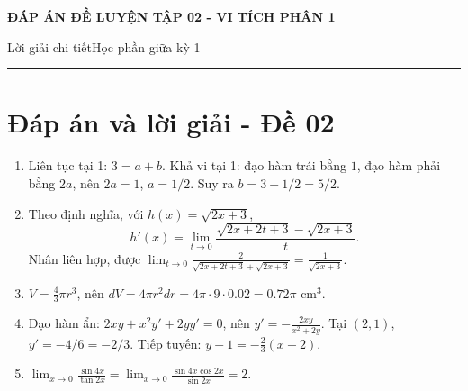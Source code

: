 \documentclass[11pt,a4paper]{article}
\newcommand{\examtitle}[4]{\begin{center}{\Large\bfseries\color{hcmusblue}#1}\par\vspace{3pt}{\large\bfseries #2}\par\vspace{3pt}\small #3\quad\textbullet\quad #4\end{center}\vspace{5pt}\hrule\vspace{8pt}}
\begin{document}
\examtitle{ĐÁP ÁN ĐỀ LUYỆN TẬP 02 - VI TÍCH PHÂN 1}{VI TÍCH PHÂN 1 - HCMUS (bộ luyện tập)}{Lời giải chi tiết}{Học phần giữa kỳ 1}

\section*{Đáp án và lời giải - Đề 02}
\begin{enumerate}
\item Liên tục tại 1: $3=a+b$. Khả vi tại 1: đạo hàm trái bằng $1$, đạo hàm phải bằng $2a$, nên $2a=1$, $a=1/2$. Suy ra $b=3-1/2=5/2$.
\item Theo định nghĩa, với $h(x)=\sqrt{2x+3}$,
\[
h'(x)=\lim_{t\to0}\frac{\sqrt{2x+2t+3}-\sqrt{2x+3}}t.
\]
Nhân liên hợp, được $\displaystyle\lim_{t\to0}\frac{2}{\sqrt{2x+2t+3}+\sqrt{2x+3}}=\frac1{\sqrt{2x+3}}$.
\item $V=\frac43\pi r^3$, nên $dV=4\pi r^2dr=4\pi\cdot9\cdot0.02=0.72\pi$ cm$^3$.
\item Đạo hàm ẩn: $2xy+x^2y'+2yy'=0$, nên $y'=-\frac{2xy}{x^2+2y}$. Tại $(2,1)$, $y'=-4/6=-2/3$. Tiếp tuyến: $y-1=-\frac23(x-2)$.
\item $\displaystyle\lim_{x\to0}\frac{\sin4x}{\tan2x}=\lim_{x\to0}\frac{\sin4x\cos2x}{\sin2x}=2$.
\end{enumerate}
\end{document}
